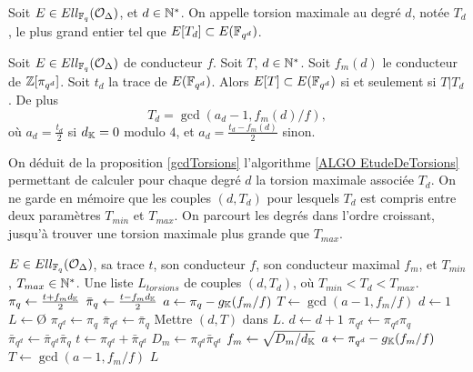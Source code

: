 \begin{Def}
	Soit $E\in Ell_{\mathbb{F}_{q}}(\mathcal{O}_{\Delta})$, et $d\in\mathbb{N}^*$. On appelle torsion maximale au degré $d$, notée $T_d$, le plus grand entier tel que $E[T_d]\subset E(\mathbb{F}_{q^{d}})$.
\end{Def}

\begin{Coro}\label{gcdTorsionsExplicite}
	Soit $E\in Ell_{\mathbb{F}_{q}}(\mathcal{O}_{\Delta})$ de conducteur $f$. Soit $T$, $d\in\mathbb{N}^{*}$. Soit $f_m(d)$ le conducteur de $\mathbb{Z}[\pi_{q^d}]$. Soit $t_d$ la trace de $E(\mathbb{F}_{q^{d}})$. Alors $E[T]\subset E(\mathbb{F}_{q^{d}})$ si et seulement si $T|T_d$. De plus 
	\begin{equation*}
		T_d = \gcd(a_d - 1, f_m(d)/f),
	\end{equation*} 
	où $a_d = \frac{t_d}{2}$ si $d_{\mathbb{K}} = 0$ modulo $4$, et $a_d = \frac{t_d - f_m(d)}{2}$ sinon. 
\end{Coro}

On déduit de la proposition \ref{gcdTorsions} l'algorithme \ref{ALGO EtudeDeTorsions} permettant de calculer pour chaque degré $d$ la torsion maximale associée $T_d$. On ne garde en mémoire que les couples $(d, T_d)$ pour lesquels $T_d$ est compris entre deux paramètres $T_{min}$ et $T_{max}$. On parcourt les degrés dans l'ordre croissant, jusqu'à trouver une torsion maximale plus grande que $T_{max}$.

\begin{algorithm}[h]
	\caption{Etude de torsion}\label{ALGO EtudeDeTorsions}
	\begin{algorithmic}[1]
		\Require $E\in Ell_{\mathbb{F}_{q}}(\mathcal{O}_{\Delta})$, sa trace $t$, son conducteur $f$, son conducteur maximal $f_m$, et $T_{min}$, $T_{max}\in\mathbb{N}^{*}$.
		\Ensure Une liste $L_{torsions}$ de couples $(d,T_d)$, où $T_{min} < T_d < T_{max}$.
		\State $\pi_{q}\gets\frac{t + f_md_{\mathbb{K}}}{2}$
		\State $\bar{\pi}_{q}\gets\frac{t - f_md_{\mathbb{K}}}{2}$
		\State $a\gets\pi_q - g_{\mathbb{K}}(f_m/f)$
		\State $T \gets \gcd(a - 1, f_m/f)$
		\State $d \gets 1$
		\State $L\gets$\O
		\State $\pi_{q^d}\gets\pi_{q}$
		\State $\bar{\pi}_{q^d}\gets\bar{\pi}_{q}$
		\EndIf
		\State Mettre $(d,T)$ dans $L$.
		\State $d\gets d + 1$
		\State $\pi_{q^d}\gets \pi_{q^d}\pi_{q}$
		\State $\bar{\pi}_{q^d}\gets \bar{\pi}_{q^d}\bar{\pi}_{q}$
		\State $t\gets \pi_{q^d} + \bar{\pi}_{q^d}$
		\State $D_m \gets \pi_{q^d}\bar{\pi}_{q^d}$
		\State $f_m \gets \sqrt{D_m/d_{\mathbb{K}}}$
		\State $a\gets\pi_{q^d} - g_{\mathbb{K}}(f_m/f)$
		\State $T \gets \gcd(a - 1, f_m/f)$
		\EndWhile
		\State \Return $L$
	\end{algorithmic}
\end{algorithm}

